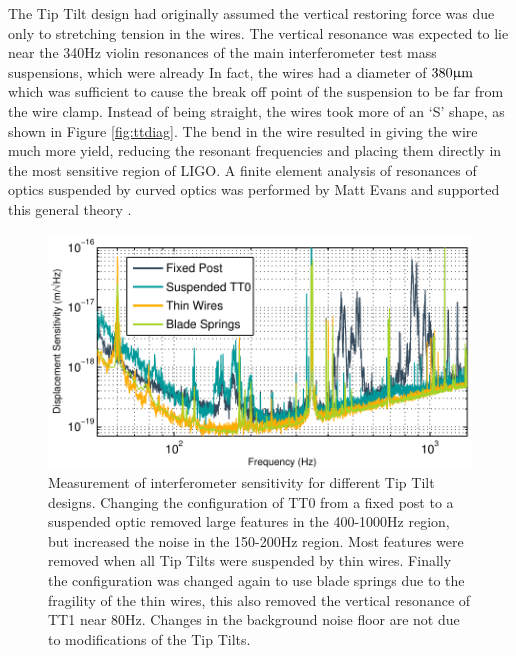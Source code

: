 The Tip Tilt design had originally assumed the vertical restoring force was due only to stretching tension in the wires. %
The vertical resonance was expected to lie near the 340Hz violin resonances of the main interferometer test mass suspensions, which were already In fact, the wires had a diameter of $380\upmu \rm m$ which was sufficient to cause the break off point of the suspension to be far from the wire clamp. %
Instead of being straight, the wires took more of an `S' shape, as shown in Figure \ref{fig:ttdiag}. %
The bend in the wire resulted in giving the wire much more yield, reducing the resonant frequencies and placing them directly in the most sensitive region of LIGO. %
A finite element analysis of resonances of optics suspended by curved optics was performed by Matt Evans and supported this general theory \cite{mattfea}.

\begin{figure}
  \begin{center}
  \leavevmode
  \includegraphics{figs-jitter/sensimprovement.pdf}
  \end{center}
  \caption[Measurement of interferometer sensitivity for different Tip Tilt designs.]{Measurement of interferometer sensitivity for different Tip Tilt designs. Changing the configuration of TT0 from a fixed post to a suspended optic removed large features in the 400-1000Hz region, but increased the noise in the 150-200Hz region. Most features were removed when all Tip Tilts were suspended by thin wires. Finally the configuration was changed again to use blade springs due to the fragility of the thin wires, this also removed the vertical resonance of TT1 near 80Hz. Changes in the background noise floor are not due to modifications of the Tip Tilts.}
  \label{fig:sensimprovement}
\end{figure}

